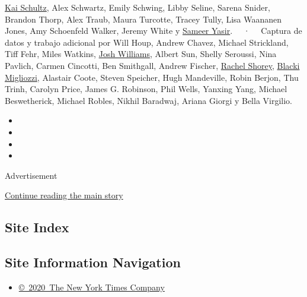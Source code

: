 \href{https://www.nytimes.com/by/kai-schultz}{Kai Schultz}, Alex
Schwartz, Emily Schwing, Libby Seline, Sarena Snider, Brandon Thorp,
Alex Traub, Maura Turcotte, Tracey Tully, Lisa Waananen Jones, Amy
Schoenfeld Walker, Jeremy White y
\href{https://www.nytimes.com/by/sameer-yasir}{Sameer Yasir}. ~~·~~
Captura de datos y trabajo adicional por Will Houp, Andrew Chavez,
Michael Strickland, Tiff Fehr, Miles Watkins,
\href{https://www.nytimes.com/by/josh-williams}{Josh Williams}, Albert
Sun, Shelly Seroussi, Nina Pavlich, Carmen Cincotti, Ben Smithgall,
Andrew Fischer, \href{https://www.nytimes.com/by/rachel-shorey}{Rachel
Shorey}, \href{https://www.nytimes.com/by/blacki-migliozzi}{Blacki
Migliozzi}, Alastair Coote, Steven Speicher, Hugh Mandeville, Robin
Berjon, Thu Trinh, Carolyn Price, James G. Robinson, Phil Wells, Yanxing
Yang, Michael Beswetherick, Michael Robles, Nikhil Baradwaj, Ariana
Giorgi y Bella Virgilio.

\begin{itemize}
\item
\item
\item
\item
\end{itemize}

Advertisement

\protect\hyperlink{after-bottom}{Continue reading the main story}

\hypertarget{site-index}{%
\subsection{Site Index}\label{site-index}}

\hypertarget{site-information-navigation}{%
\subsection{Site Information
Navigation}\label{site-information-navigation}}

\begin{itemize}
\tightlist
\item
  \href{https://help.nytimes.com/hc/en-us/articles/115014792127-Copyright-notice}{©~2020~The
  New York Times Company}
\end{itemize}

